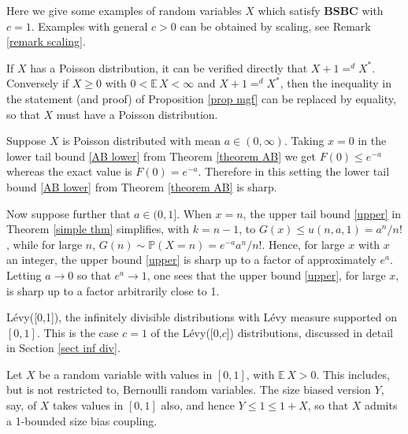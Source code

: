 \documentclass[smallextended,envcountsect]{svjour3}
\begin{document}
Here we give some examples of random variables $X$ which satisfy {\bf BSBC} with $c = 1$.  Examples with general $c > 0$ can be obtained by scaling, see Remark \ref{remark scaling}.

\begin{example} \label{example poisson}  If $X$ has a Poisson distribution, it can be verified directly that $X+1 =^d X^*$.  Conversely if $X \ge 0$ with $0 < {\mathbb{E \,}} X <\infty$ and $X+1 =^d X^*$, then the inequality in the statement (and proof) of Proposition  \ref{prop mgf} can be replaced by equality, so that $X$ must have a Poisson distribution.

\end{example}

\begin{remark}
\label{remark sharp upper}
Suppose $X$ is Poisson distributed with mean $a \in(0,\infty)$.  Taking $x = 0$ in the lower tail bound \eqref{AB lower} from Theorem \ref{theorem AB} we get $F(0) \le e^{-a}$ whereas the exact value is $F(0) = e^{-a}$.  Therefore in this setting the lower tail bound \eqref{AB lower} from Theorem \ref{theorem AB} is sharp.

Now suppose further that $a \in (0,1]$.  When $x=n$, the upper tail bound \eqref{upper} in Theorem \ref{simple thm} simplifies, with $k=n-1$, to
$G(x) \le u(n,a,1)= a^n/n!$,
while for large $n$, $G(n) \sim {\mathbb{P}}(X=n) = e^{-a} a^n/n!$.  Hence, for large $x$ with $x$ an integer, the upper bound \eqref{upper} is sharp up to a factor of approximately $e^{a}$.  Letting $a \to 0$ so that $e^{a} \to 1$, one sees that the upper bound \eqref{upper}, for large $x$, is sharp up to a factor arbitrarily close to 1.
\end{remark}

\begin{example} \label{example inf div} L\'evy([0,1]), the infinitely divisible distributions with L\'evy measure supported on $[0,1]$.  This is the case $c=1$ of the L\'evy([0,$c$]) distributions, discussed in detail in Section \ref{sect inf div}.
\end{example}

\begin{example} \label{example 01}  Let $X$ be a random variable with values in $[0,1]$, with ${\mathbb{E \,}} X > 0$.  This includes, but is not restricted to, Bernoulli random variables.  The size biased version $Y$, say, of $X$ takes values in $[0,1]$ also, and hence $Y \le 1 \le 1+X$, so that $X$ admits a 1-bounded size bias coupling.
\end{example}
\end{document}
